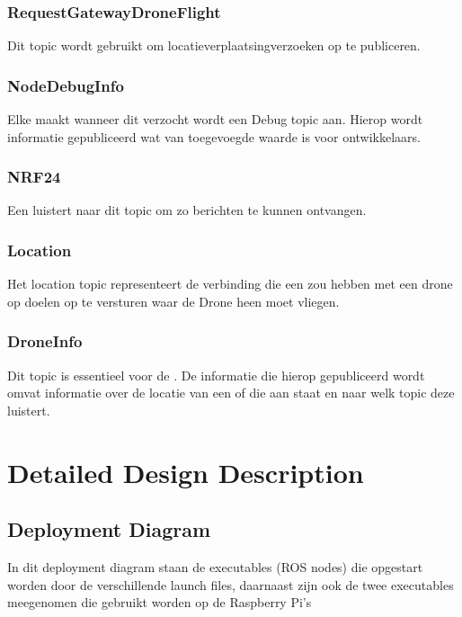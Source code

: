 \documentclass[a4paper, 11pt, oneside]{report}
\begin{document}
\subsection{RequestGatewayDroneFlight}
\label{architectural:ros:topic:RequestGatewayDroneFlight}
Dit topic wordt gebruikt om locatieverplaatsingverzoeken op te publiceren. 

\subsection{NodeDebugInfo}
\label{architectural:ros:topic:NodeDebugInfo}
Elke  maakt wanneer dit verzocht wordt een Debug topic aan. Hierop wordt informatie gepubliceerd wat van toegevoegde waarde is voor ontwikkelaars.

\subsection{NRF24}
\label{architectural:ros:topic:NRF24}
Een  luistert naar dit topic om zo berichten te kunnen ontvangen.

\subsection{Location}
\label{architectural:ros:topic:Location}
Het location topic representeert de verbinding die een  zou hebben met een drone op doelen op te versturen waar de Drone heen moet vliegen. 

\subsection{DroneInfo}
\label{architectural:ros:topic:DroneInfo}
Dit topic is essentieel voor de . De informatie die hierop gepubliceerd wordt omvat informatie over de locatie van een  of die aan staat en naar welk  topic deze luistert.

\chapter{Detailed Design Description}
\label{DetailedDesign}

\section{Deployment Diagram}
\label{DetailedDesign:deployment}
In dit deployment diagram staan de executables (ROS nodes) die opgestart worden door de verschillende launch files, daarnaast zijn ook de twee executables meegenomen die gebruikt worden op de Raspberry Pi's
\end{document}
